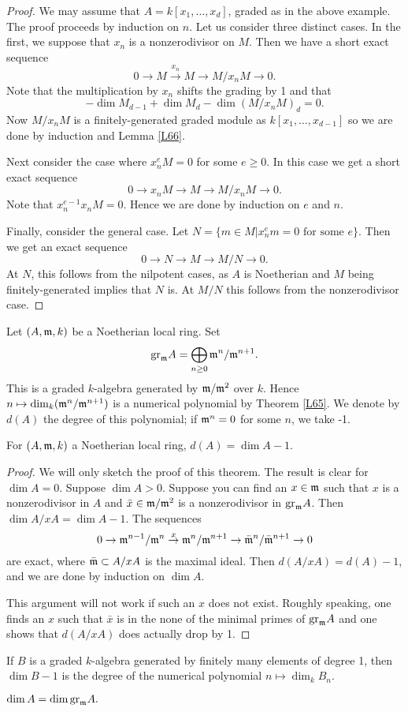 \documentclass{../mathnotes}
\begin{document}
\begin{proof}
We may assume that $A=k[x_1,\ldots, x_d]$, graded as in the above example. The proof proceeds by induction on $n$. Let us consider three distinct cases. In the first, we suppose that $x_n$ is a nonzerodivisor on $M$. Then we have a short exact sequence
\[0\to M\overset{x_n}{\to}M\to M/x_nM\to 0.\]
Note that the multiplication by $x_n$ shifts the grading by 1 and that
\[-\dim M_{d-1}+\dim M_d-\dim \left( M/x_nM\right)_d=0.\]
Now $M/x_nM$ is a finitely-generated graded module  as $k[x_1,\ldots,x_{d-1}]$ so we are done by induction and Lemma \ref{L66}.

Next consider the case where $x_n^eM=0$ for some $e\geq 0$. In this case we get a short exact sequence
\[0\to x_nM\to M\to M/x_nM\to 0.\]
Note that $x_n^{e-1}x_nM=0$. Hence we are done by induction on $e$ and $n$.

Finally, consider the general case. Let $N=\{m\in M | x_n^e m=0\text{ for some }e\}$. Then
we get an exact sequence
\[0\to N\to M\to M/N\to 0.\]
At $N$, this follows from the nilpotent cases, as $A$ is Noetherian and $M$ being finitely-generated implies that $N$ is. At $M/N$ this follows from the nonzerodivisor case.
\end{proof}

\begin{defn}
Let $(A,\mathfrak m, k)$ be a Noetherian local ring. Set
\[\text{gr}_\mathfrak m A=\bigoplus_{n\geq0}\mathfrak m^n/\mathfrak m^{n+1}.\]
This is a graded $k$-algebra generated by $\mathfrak m/\mathfrak m^2$ over $k$. Hence
$n\mapsto\dim_k(\mathfrak m^n/\mathfrak m^{n+1})$ is a numerical polynomial by Theorem \ref{L65}.
We denote by $d(A)$ the degree of this polynomial; if $\mathfrak m^n=0$ for some $n$, we take -1.
\end{defn}

\begin{thm*}
For $(A,\mathfrak m,k)$ a Noetherian local ring, $d(A)=\dim A-1$.
\end{thm*}
\begin{proof}
We will only sketch the proof of this theorem.
The result is clear for $\dim A=0$. Suppose $\dim A>0$. Suppose you can find an $x\in\mathfrak m$ such that $x$ is a nonzerodivisor in $A$ and $\bar x\in\mathfrak m/\mathfrak m^2$ is a nonzerodivisor in $\text{gr}_\mathfrak m A$. Then $\dim A/xA=\dim A-1$. The sequences
\[0\to\mathfrak m^{n-1}/\mathfrak m^n\overset{x}{\to}\mathfrak m^n/\mathfrak m^{n+1}\to \bar{\mathfrak m}^n/\bar{\mathfrak m}^{n+1}\to 0 \]
are exact, where $\bar{\mathfrak m}\subset A/xA$ is the maximal ideal. Then $d(A/xA)=d(A)-1$, and we are done by induction on $\dim A$.

This argument will not work if such an $x$ does not exist. Roughly speaking, one finds an $x$ such that $\bar x$ is in the none of the minimal primes of $\text{gr}_\mathfrak mA$ and one shows that $d(A/xA)$ does actually drop by 1.
\end{proof}

\begin{thm*}
If $B$ is a graded $k$-algebra generated by finitely many elements of degree 1, then $\dim B-1$ is the degree of the numerical polynomial $n\mapsto\dim_k B_n$.
\end{thm*}

\begin{cor*}
$\dim A=\dim\text{gr}_\mathfrak m A.$
\end{cor*}
\end{document}

